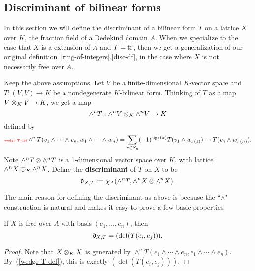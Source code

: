 \subsection{Discriminant of bilinear forms}
In this section we will define the discriminant of a bilinear form $T$ on a lattice $X$ over $K$, the fraction field of a Dedekind domain $A$. When we specialize to the case that $X$ is a extension of $A$ and $T=\operatorname{tr}$, then we get a generalization of our original definition~\ref{ring-of-integers}.\ref{disc-df}, in the case where $X$ is not necessarily free over $A$.
\begin{df}
Keep the above assumptions. 
Let $V$ be a finite-dimensional $K$-vector space and $T:(V,V)\to K$ be a nondegenerate $K$-bilinear form. Thinking of $T$ as a map $V\otimes_K V\to K$, 
we get a map
\[
\wedge^nT:\wedge^nV\otimes_K \wedge^n V\to K
\]
defined by 
\begin{equation}\llabel{wedge-T-def}
\wedge^n T(v_1\wedge\cdots \wedge v_n, w_1\wedge \cdots \wedge w_n)=\sum_{\pi\in S_n}(-1)^{\sign(\pi)} T(v_1\wedge w_{\pi(1)})\cdots T(v_n\wedge w_{\pi(n)}).
\end{equation} 
Note $\wedge^n T\otimes\wedge^n T$ is a 1-dimensional vector space over $K$, with lattice $\wedge^n X\otimes_K\wedge^n X$.
Define the \textbf{discriminant} of $T$ on $X$ to be 
\[\mathfrak d_{X,T}:=\chi_A(\wedge^nT,\wedge^nX\otimes \wedge^nX).\]
\end{df}
The main reason for defining the discriminant as above is because the ``$\wedge$" construction is natural and makes it easy to prove a few basic properties. 
\begin{pr}
If $X$ is free over $A$ with basis $(e_1,\ldots, e_n)$, then%
\[\mathfrak d_{X,T}=(\det(T(e_i, e_j))).\]
\end{pr}
\begin{proof}
Note that $X\otimes_K X$ is generated by $\wedge^n T(e_1\wedge \cdots \wedge e_n, e_1\wedge \cdots \wedge e_n)$. By~(\ref{wedge-T-def}), this is exactly $(\det(T(e_i, e_j)))$.
\end{proof}

